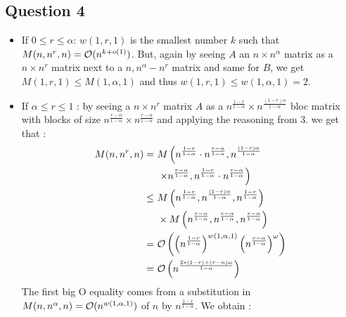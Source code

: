 \documentclass{cours}
\begin{document}
        \subsection{Question 4}
            \begin{itemize}
                \item If $0 \leq r \leq \alpha$: $w(1, r, 1)$ is the smallest number $k$ such that $M(n, n^{r}, n) = \mathcal{O}(n^{k + o(1)})$. But, again by seeing $A$ an $n\times n^{\alpha}$ matrix as a $n\times n^{r}$ matrix next to a $n, n^{\alpha} - n^{r}$ matrix and same for $B$, we get $M(1, r, 1) \leq M(1, \alpha, 1)$ and thus $w(1, r, 1) \leq w(1, \alpha, 1) = 2$.
                \item If $\alpha \leq r \leq 1$ : by seeing a $n \times n^{r}$ matrix $A$ as a $n^{\frac{1 - r}{1 - \alpha}} \times n^{\frac{\left(1 - r\right)\alpha}{1 - \alpha}}$ bloc matrix with blocks of size $n^{\frac{r - \alpha}{1 - \alpha }}\times n^{\frac{r - \alpha}{1 - \alpha}}$ and applying the reasoning from 3. we get that : 
                \[
                    \begin{aligned}
                        M(n, n^{r}, n) = &\ M\left(n^{\frac{1 - r}{1 - \alpha}} \cdot n^{\frac{r - \alpha}{1 - \alpha }}, n^{\frac{\left(1 - r\right)\alpha}{1 - \alpha}}\right.\\ 
                        &\ \left.\times n^{\frac{r - \alpha}{1 - \alpha}}, n^{\frac{1 - r}{1 - \alpha}} \cdot n^{\frac{r - \alpha}{1 - \alpha }}\right)\\
                         \leq&\  M\left(n^{\frac{1 - r}{1 - \alpha}}, n^{\frac{(1 - r)\alpha}{1 - \alpha}}, n^{\frac{1 - r}{1 - \alpha}}\right)\\
                        &\ \times M\left(n^{\frac{r - \alpha}{1 - \alpha}}, n^{\frac{r - \alpha}{1 - \alpha}}, n^{\frac{r - \alpha}{1 - \alpha}}\right)\\
                        = &\ \mathcal{O}\left(\left(n^{\frac{1 - r}{1 - \alpha}}\right)^{{w(1, \alpha, 1)}}\left(n^{\frac{r - \alpha}{1 - \alpha}}\right)^{\omega}\right)\\
                        = &\ \mathcal{O}\left(n^{\frac{2 * (1 - r) + \left(r - \alpha\right) \omega}{1 - \alpha}}\right)
                    \end{aligned}      
                \]
                The first big O equality comes from a substitution in $M(n, n^{\alpha}, n) = \mathcal{O}(n^{w(1, \alpha, 1)})$ of $n$ by $n^{\frac{1 - r}{1 - \alpha}}$.
                We obtain : 
                \[
                    \begin{aligned}

\end{aligned}\]
\end{itemize}
\end{document}
